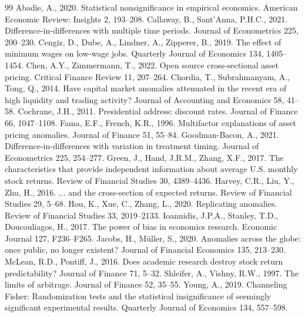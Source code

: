 \documentclass[12pt]{article}
\begin{document}
\begin{thebibliography}{99}
 Abadie, A., 2020. Statistical nonsignificance in empirical
economics. American Economic Review: Insights 2, 193--208.
 Callaway, B., Sant'Anna, P.H.C., 2021.
Difference-in-differences with multiple time periods. Journal of Econometrics 225, 200--230.
 Cengiz, D., Dube, A., Lindner, A., Zipperer, B., 2019.
The effect of minimum wages on low-wage jobs. Quarterly Journal of Economics 134, 1405--1454.
 Chen, A.Y., Zimmermann, T., 2022.
Open source cross-sectional asset pricing. Critical Finance Review 11, 207--264.
 Chordia, T., Subrahmanyam, A., Tong, Q., 2014.
Have capital market anomalies attenuated in the recent era of high liquidity and trading activity?
Journal of Accounting and Economics 58, 41--58.
 Cochrane, J.H., 2011.
Presidential address: discount rates. Journal of Finance 66, 1047--1108.
 Fama, E.F., French, K.R., 1996.
Multifactor explanations of asset pricing anomalies. Journal of Finance 51, 55--84.
 Goodman-Bacon, A., 2021.
Difference-in-differences with variation in treatment timing. Journal of Econometrics 225, 254--277.
 Green, J., Hand, J.R.M., Zhang, X.F., 2017.
The characteristics that provide independent information about average U.S. monthly stock returns.
Review of Financial Studies 30, 4389--4436.
 Harvey, C.R., Liu, Y., Zhu, H., 2016.
$\ldots$ and the cross-section of expected returns. Review of Financial Studies 29, 5--68.
 Hou, K., Xue, C., Zhang, L., 2020.
Replicating anomalies. Review of Financial Studies 33, 2019--2133.
 Ioannidis, J.P.A., Stanley, T.D., Doucouliagos, H.,
2017. The power of bias in economics research. Economic Journal 127, F236--F265.
 Jacobs, H., M\"uller, S., 2020.
Anomalies across the globe: once public, no longer existent? Journal of Financial Economics 135, 213--230.
 McLean, R.D., Pontiff, J., 2016.
Does academic research destroy stock return predictability? Journal of Finance 71, 5--32.
 Shleifer, A., Vishny, R.W., 1997.
The limits of arbitrage. Journal of Finance 52, 35--55.
 Young, A., 2019. Channeling Fisher: Randomization tests and the
statistical insignificance of seemingly significant experimental results. Quarterly Journal of
Economics 134, 557--598.
\end{thebibliography}
\end{document}
